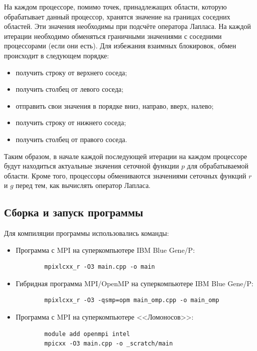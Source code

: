 \documentclass[11pt]{article}
\numberwithin{equation}{section}
\theoremstyle{plain}
\theoremstyle{definition}
\begin{document}
На каждом процессоре, помимо точек, принадлежащих области, которую обрабатывает
данный процессор, хранятся значение на границах соседних областей. Эти
значения необходимы при подсчёте оператора Лапласа.
На каждой итерации необходимо обменяться граничными значениями с соседними
процессорами (если они есть). Для избежания взаимных блокировок, обмен
происходит в следующем порядке:
\begin{itemize}
    \item получить строку от верхнего соседа;
    \item получить столбец от левого соседа;
    \item отправить свои значения в порядке вниз, направо, вверх, налево;
    \item получить строку от нижнего соседа;
    \item получить столбец от правого соседа.
\end{itemize}

Таким образом, в начале каждой последующей итерации на каждом процессоре будут
находиться актуальные значения сеточной функции $p$ для обрабатываемой области.
Кроме того, процессоры обмениваются значениями сеточных функций $r$ и $g$ перед
тем, как вычислять оператор Лапласа.

\subsection{Сборка и запуск программы}

Для компиляции программы использовались команды:
\begin{itemize}
    \item Программа с MPI на суперкомпьютере IBM Blue Gene/P:
        \begin{verbatim}
        mpixlcxx_r -O3 main.cpp -o main
        \end{verbatim}
    \item Гибридная программа MPI/OpenMP на суперкомпьютере IBM Blue Gene/P:
        \begin{verbatim}
        mpixlcxx_r -O3 -qsmp=opm main_omp.cpp -o main_omp
        \end{verbatim}
    \item Программа с MPI на суперкомпьютере <<Ломоносов>>:
        \begin{verbatim}
        module add openmpi intel
        mpicxx -O3 main.cpp -o _scratch/main
        \end{verbatim}
\end{itemize}
\end{document}
